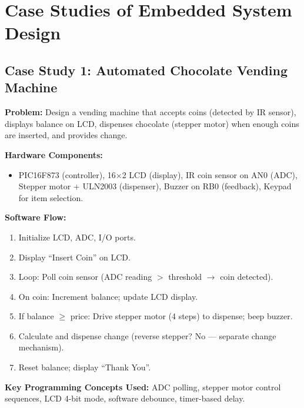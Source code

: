 \documentclass[12pt,a4paper]{article}
\begin{document}
\section{Case Studies of Embedded System Design}

\subsection{Case Study 1: Automated Chocolate Vending Machine}

\begin{tcolorbox}[examplebox, title={\textbf{Automated Chocolate Vending Machine using PIC16F873}}]
\textbf{Problem:} Design a vending machine that accepts coins (detected by IR sensor), displays balance on LCD, dispenses chocolate (stepper motor) when enough coins are inserted, and provides change.

\textbf{Hardware Components:}
\begin{itemize}[leftmargin=*, itemsep=2pt, topsep=4pt]
  \item PIC16F873 (controller), 16$\times$2 LCD (display), IR coin sensor on AN0 (ADC), Stepper motor + ULN2003 (dispenser), Buzzer on RB0 (feedback), Keypad for item selection.
\end{itemize}

\textbf{Software Flow:}
\begin{enumerate}[topsep=4pt, leftmargin=*, itemsep=2pt]
  \item Initialize LCD, ADC, I/O ports.
  \item Display ``Insert Coin'' on LCD.
  \item Loop: Poll coin sensor (ADC reading $>$ threshold $\to$ coin detected).
  \item On coin: Increment balance; update LCD display.
  \item If balance $\geq$ price: Drive stepper motor (4 steps) to dispense; beep buzzer.
  \item Calculate and dispense change (reverse stepper? No --- separate change mechanism).
  \item Reset balance; display ``Thank You''.
\end{enumerate}

\textbf{Key Programming Concepts Used:} ADC polling, stepper motor control sequences, LCD 4-bit mode, software debounce, timer-based delay.
\end{tcolorbox}
\end{document}
